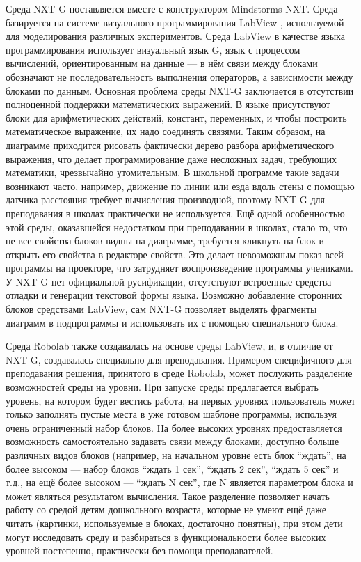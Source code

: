 Среда NXT-G 
поставляется вместе с конструктором Mindstorms NXT. Среда базируется на системе визуального программирования LabView%
, используемой для моделирования различных экспериментов. Среда LabView в качестве 
языка программирования использует визуальный язык G, язык с процессом вычислений, 
ориентированным на данные --- в нём связи между блоками обозначают не последовательность 
выполнения операторов, а зависимости между блоками по данным. Основная проблема среды NXT-G 
заключается в отсутствии полноценной поддержки математических выражений. В языке присутствуют 
блоки для арифметических действий, констант, переменных, и чтобы построить математическое
выражение, их надо соединять связями. Таким образом, на диаграмме приходится рисовать 
фактически дерево разбора арифметического выражения, что делает программирование даже 
несложных задач, требующих математики, чрезвычайно утомительным. В школьной программе 
такие задачи возникают часто, например, движение по линии или езда вдоль стены с помощью 
датчика расстояния требует вычисления производной, поэтому NXT-G для преподавания в 
школах практически не используется. Ещё одной особенностью этой среды, оказавшейся 
недостатком при преподавании в школах, стало то, что не все свойства блоков видны 
на диаграмме, требуется кликнуть на блок и открыть его свойства в редакторе свойств. 
Это делает невозможным показ всей программы на проекторе, что затрудняет воспроизведение 
программы учениками. У NXT-G нет официальной русификации, отсутствуют встроенные 
средства отладки и генерации текстовой формы языка. Возможно добавление сторонних 
блоков средствами LabView, сам NXT-G позволяет выделять фрагменты диаграмм в подпрограммы 
и использовать их с помощью специального блока.

Среда Robolab
также создавалась на основе среды LabView, и, в отличие от NXT-G, создавалась 
специально для преподавания. Примером специфичного для преподавания решения, принятого 
в среде Robolab, может послужить разделение возможностей среды на уровни. При запуске 
среды предлагается выбрать уровень, на котором будет вестись работа, на первых уровнях 
пользователь может только заполнять пустые места в уже готовом шаблоне программы, 
используя очень ограниченный набор блоков. На более высоких уровнях предоставляется 
возможность самостоятельно задавать связи между блоками, доступно больше различных 
видов блоков (например, на начальном уровне есть блок "`ждать"', на более высоком --- 
набор блоков "`ждать 1 сек"', "`ждать 2 сек"', "`ждать 5 сек"' и т.д., на ещё более 
высоком --- "`ждать N сек"', где N является параметром блока и может являться результатом 
вычисления. Такое разделение позволяет начать работу со средой детям дошкольного возраста, 
которые не умеют ещё даже читать (картинки, используемые в блоках, достаточно понятны), 
при этом дети могут исследовать среду и разбираться в функциональности более высоких 
уровней постепенно, практически без помощи преподавателей.

